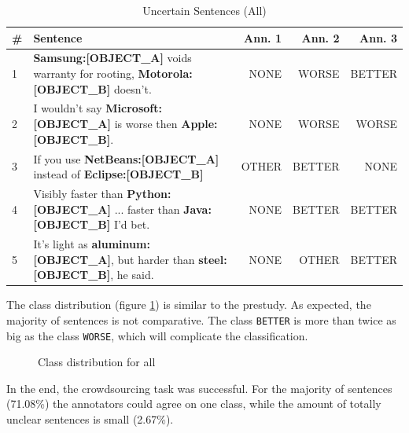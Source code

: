 \begin{table}[h]
\centering
\caption{Uncertain Sentences (All)}
\label{tbl:all_res}
\begin{tabularx}{\textwidth}{lXrrr}
\toprule
\# & Sentence        & Ann. 1  & Ann. 2 & Ann. 3             \\ \midrule
1 & \textbf{{\color[HTML]{9A14B2}Samsung:{[}OBJECT\_A{]}}} voids warranty for rooting, \textbf{{\color[HTML]{6CB219}Motorola:{[}OBJECT\_B{]}}} doesn't. & NONE & WORSE & BETTER\\
2 & I wouldn't say \textbf{{\color[HTML]{9A14B2}Microsoft:{[}OBJECT\_A{]}}} is worse then \textbf{{\color[HTML]{6CB219}Apple:{[}OBJECT\_B{]}}}. & NONE & WORSE & WORSE\\

3 & If you use \textbf{{\color[HTML]{9A14B2}NetBeans:{[}OBJECT\_A{]}}} instead of \textbf{{\color[HTML]{6CB219}Eclipse:{[}OBJECT\_B{]}}} & OTHER & BETTER & NONE \\
4 & Visibly faster than \textbf{{\color[HTML]{9A14B2}Python:{[}OBJECT\_A{]}}} ... faster than \textbf{{\color[HTML]{6CB219}Java:{[}OBJECT\_B{]}}} I'd bet. & NONE & BETTER & BETTER \\
5 & It's light as \textbf{{\color[HTML]{9A14B2}aluminum:{[}OBJECT\_A{]}}}, but harder than \textbf{{\color[HTML]{6CB219}steel:{[}OBJECT\_B{]}}}, he said. & NONE & OTHER & BETTER\\
\bottomrule                              
\end{tabularx}
\end{table}


The class distribution (figure \ref{fig:all_fin}) is similar to the prestudy. As expected, the majority of sentences is not comparative. 
The class \texttt{BETTER} is more than twice as big as the class \texttt{WORSE}, which will complicate the classification.
\begin{figure}[h]
\centering
\caption{Class distribution for all}
\label{fig:all_fin}
\end{figure}

In the end, the crowdsourcing task was successful. For the majority of sentences (71.08\%) the annotators could agree on one class, while the amount of totally unclear sentences is small (2.67\%).